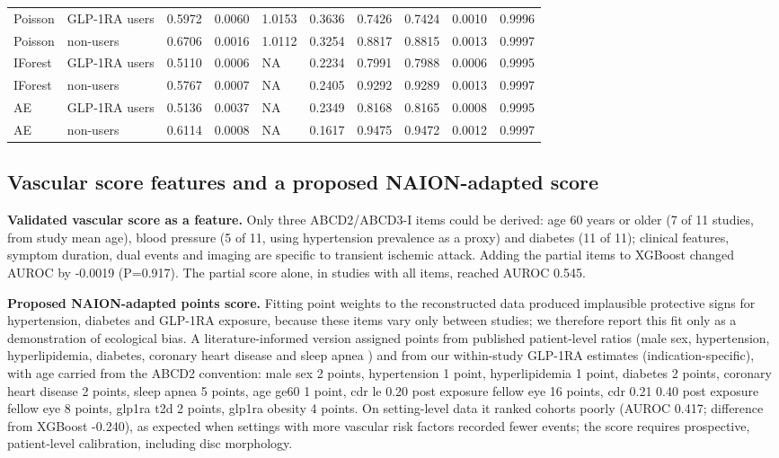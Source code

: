 \documentclass[journal]{IEEEtran}
\begin{document}
\begin{table}[!htbp]
{\begin{tabular}{llllllllll}
Poisson & GLP-1RA users & 0.5972 & 0.0060 & 1.0153 & 0.3636 & 0.7426 & 0.7424 & 0.0010 & 0.9996 \\
Poisson & non-users & 0.6706 & 0.0016 & 1.0112 & 0.3254 & 0.8817 & 0.8815 & 0.0013 & 0.9997 \\
IForest & GLP-1RA users & 0.5110 & 0.0006 & NA & 0.2234 & 0.7991 & 0.7988 & 0.0006 & 0.9995 \\
IForest & non-users & 0.5767 & 0.0007 & NA & 0.2405 & 0.9292 & 0.9289 & 0.0013 & 0.9997 \\
AE & GLP-1RA users & 0.5136 & 0.0037 & NA & 0.2349 & 0.8168 & 0.8165 & 0.0008 & 0.9995 \\
AE & non-users & 0.6114 & 0.0008 & NA & 0.1617 & 0.9475 & 0.9472 & 0.0012 & 0.9997 \\
\bottomrule\end{tabular}}
\end{table}

\subsection{Vascular score features and a proposed NAION-adapted
score}\label{vascular-score-features-and-a-proposed-naion-adapted-score}

\textbf{Validated vascular score as a feature.} Only three ABCD2/ABCD3-I
items could be derived: age 60 years or older (7 of 11 studies, from
study mean age), blood pressure (5 of 11, using hypertension prevalence
as a proxy) and diabetes (11 of 11); clinical features, symptom
duration, dual events and imaging are specific to transient ischemic
attack. Adding the partial items to XGBoost changed AUROC by -0.0019
(P=0.917). The partial score alone, in studies with all items, reached
AUROC 0.545.

\textbf{Proposed NAION-adapted points score.} Fitting point weights to
the reconstructed data produced implausible protective signs for
hypertension, diabetes and GLP-1RA exposure, because these items vary
only between studies; we therefore report this fit only as a
demonstration of ecological bias. A literature-informed version assigned
points from published patient-level ratios (male sex, hypertension,
hyperlipidemia, diabetes, coronary heart disease and sleep apnea
\cite{p34671609}) and from our within-study GLP-1RA estimates
(indication-specific), with age carried from the ABCD2 convention: male
sex 2 points, hypertension 1 point, hyperlipidemia 1 point, diabetes 2
points, coronary heart disease 2 points, sleep apnea 5 points, age ge60
1 point, cdr le 0.20 post exposure fellow eye 16 points, cdr 0.21 0.40
post exposure fellow eye 8 points, glp1ra t2d 2 points, glp1ra obesity 4
points. On setting-level data it ranked cohorts poorly (AUROC 0.417;
difference from XGBoost -0.240), as expected when settings with more
vascular risk factors recorded fewer events; the score requires
prospective, patient-level calibration, including disc morphology.
\end{document}

